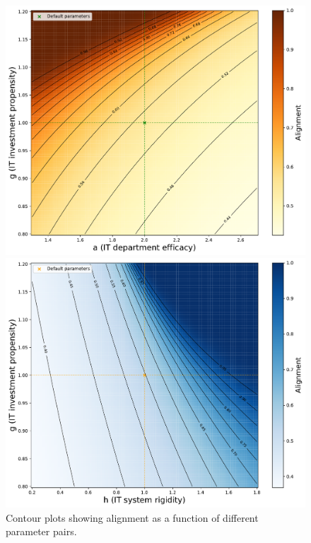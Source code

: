 \documentclass[a4paper, 10pt]{article}
\begin{document}
\begin{figure}[h]
\begin{minipage}[b]{0.48\textwidth}
    \end{minipage}
    \par\vspace{1em}
    \begin{minipage}[b]{0.48\textwidth}
        \includegraphics[width=\textwidth]{../images/int-cases/sim-3.pdf}
    \end{minipage}
    \hfill
    \begin{minipage}[b]{0.48\textwidth}
        \includegraphics[width=\textwidth]{../images/int-cases/sim-4.pdf}
    \end{minipage}
    \caption{Contour plots showing alignment as a function of different parameter pairs.}
    \label{fig:alignment-contour-plots}
\end{figure}
\end{document}
